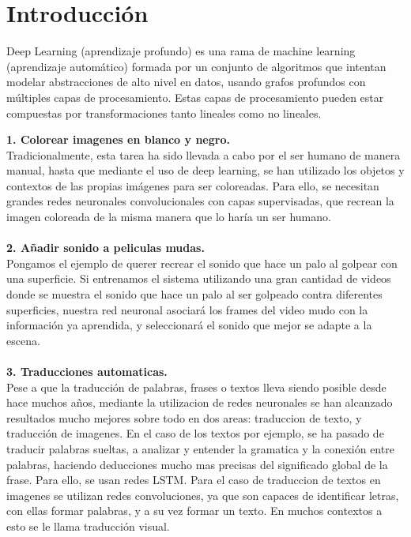 \chapter{Introducción} 
\label{chap:intro}

\vspace{-0.2cm}


Deep Learning (aprendizaje profundo) es una rama de machine learning (aprendizaje automático) formada por un conjunto de algoritmos que intentan modelar abstracciones de alto nivel en datos, usando grafos profundos con múltiples capas de procesamiento. Estas capas de procesamiento pueden estar compuestas por transformaciones tanto lineales como no lineales.

\textbf{1. Colorear imagenes en blanco y negro.}\\
Tradicionalmente, esta tarea ha sido llevada a cabo por el ser humano de manera manual, hasta que mediante el uso de deep learning, se han utilizado los objetos y contextos de las propias imágenes para ser coloreadas. Para ello, se necesitan grandes redes neuronales convolucionales con capas supervisadas, que recrean la imagen coloreada de la misma manera que lo haría un ser humano.\\
\\\textbf{2. Añadir sonido a peliculas mudas.}\\
Pongamos el ejemplo de querer recrear el sonido que hace un palo al golpear con una superficie. Si entrenamos el sistema utilizando una gran cantidad de videos donde se muestra el sonido que hace un palo al ser golpeado contra diferentes superficies, nuestra red neuronal asociará los frames del video mudo con la información ya aprendida, y seleccionará el sonido que mejor se adapte a la escena.\\
\\\textbf{3. Traducciones automaticas.}\\
Pese a que la traducción de palabras, frases o textos lleva siendo posible desde hace muchos años, mediante la utilizacion de redes neuronales se han alcanzado resultados mucho mejores sobre todo en dos areas: traduccion de texto, y traducción de imagenes. En el caso de los textos por ejemplo, se ha pasado de traducir palabras sueltas, a analizar y entender la gramatica y la conexión entre palabras, haciendo deducciones mucho mas precisas del significado global de la frase. Para ello, se usan redes LSTM. Para el caso de traduccion de textos en imagenes se utilizan redes convoluciones, ya que son capaces de identificar letras, con ellas formar palabras, y a su vez formar un texto. En muchos contextos a esto se le llama traducción visual.\\
